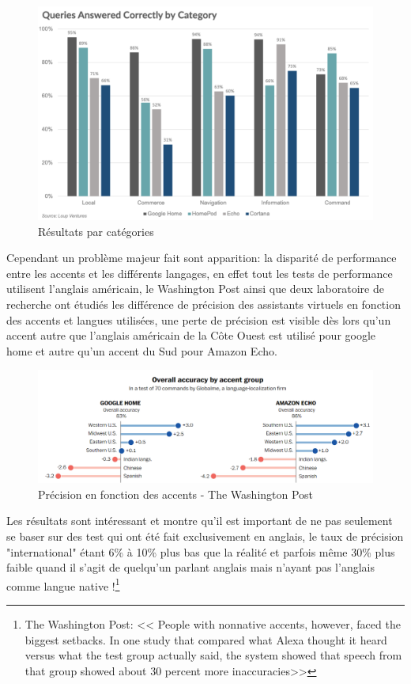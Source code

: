 \begin{figure}[H]
    \centering
    \includegraphics[width=1.0\textwidth]{Images/vaquerybycategory}
    \caption{Résultats par catégories}
    \label{fig:watsonlogo}
\end{figure}

Cependant un problème majeur fait sont apparition: la disparité de performance entre les accents
et les différents langages, en effet tout les tests de performance utilisent l'anglais américain,
le Washington Post ainsi que deux laboratoire de recherche ont étudiés les différence
de précision des assistants virtuels en fonction des accents et langues utilisées, une
perte de précision est visible dès lors qu'un accent autre que l'anglais américain de la Côte Ouest
est utilisé pour google home et autre qu'un accent du Sud pour Amazon Echo.

\begin{figure}[H]
    \centering
    \includegraphics[width=1.0\textwidth]{Images/accuracyperaccent}
    \caption{Précision en fonction des accents - The Washington Post}
    \label{fig:accentaccuracy}
\end{figure}

Les résultats sont intéressant et montre qu'il est important de ne pas seulement se baser sur des
test qui ont été fait exclusivement en anglais, le taux de précision "international" étant
6\% à 10\% plus bas que la réalité et parfois même 30\% plus faible quand il s'agit de quelqu'un
parlant anglais mais n'ayant pas l'anglais comme langue native !\footnote{The Washington Post:
<< People with nonnative accents, however, faced the biggest setbacks. In one study that compared
what Alexa thought it heard versus what the test group actually said, the system showed that speech
from that group showed about 30 percent more inaccuracies>>} \newline

